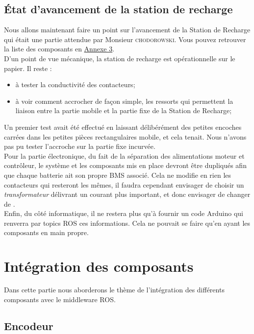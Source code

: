 \documentclass[french]{rapportENSTAB}
\begin{document}
\subsection{État d'avancement de la station de recharge} \label{station}
Nous allons maintenant faire un point sur l'avancement  de la Station de Recharge qui était une partie attendue par Monsieur \textsc{chodorowski}. Vous pouvez retrouver la liste des composants en \hyperlink{annexe3}{Annexe 3}.\\

D'un point de vue mécanique, la station de recharge est opérationnelle sur le papier. Il reste : \begin{itemize}[label=\textbullet, font=\small\color{blue}]
    \item à tester la conductivité des contacteurs;
    \item à voir comment accrocher de façon simple, les ressorts qui permettent la liaison entre la partie mobile et la partie fixe de la Station de Recharge;
\end{itemize} 
Un premier test avait été effectué en laissant délibérément des petites encoches carrées dans les petites pièces rectangulaires mobile, et cela tenait. Nous n'avons pas pu tester l'accroche sur la partie fixe incurvée.\\

Pour la partie électronique, du fait de la séparation des alimentations moteur et contrôleur, le système et les composants mis en place devront être dupliqués afin que chaque batterie ait son propre BMS associé. Cela ne modifie en rien les contacteurs qui resteront les mêmes, il faudra cependant envisager de choisir un \textit{transformateur} délivrant un courant plus important, et donc envisager de changer de .\\

Enfin, du côté informatique, il ne restera plus qu'à fournir un code Arduino qui renverra par topics ROS ces informations. Cela ne pouvait se faire qu'en ayant les composants en main propre.

\pagebreak
\section{Intégration des composants}
Dans cette partie nous aborderons le thème de l'intégration des différents composants avec le middleware ROS.


\subsection{Encodeur}
\end{document}

